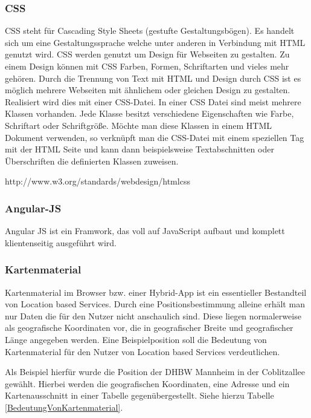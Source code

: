\subsubsection{CSS}
CSS steht für Cascading Style Sheets (gestufte Gestaltungsbögen). Es handelt sich um eine Gestaltungssprache welche unter anderen in Verbindung mit HTML genutzt wird. CSS werden genutzt um Design für Webseiten zu gestalten. Zu einem Design können mit CSS Farben, Formen, Schriftarten und vieles mehr gehören. Durch die Trennung von Text mit HTML und Design durch CSS ist es möglich mehrere Webseiten mit ähnlichem oder gleichen Design zu gestalten. Realisiert wird dies mit einer CSS-Datei. In einer CSS Datei sind meist mehrere Klassen vorhanden. Jede Klasse besitzt verschiedene Eigenschaften wie Farbe, Schriftart oder Schriftgröße. Möchte man diese Klassen in einem HTML Dokument verwenden, so verknüpft man die CSS-Datei mit einem speziellen Tag mit der HTML Seite und kann dann beispielsweise Textabschnitten oder Überschriften die definierten Klassen zuweisen.

http://www.w3.org/standards/webdesign/htmlcss

\subsubsection{Angular-JS}
Angular JS ist ein Framwork, das voll auf JavaScript aufbaut und komplett klientenseitig ausgeführt wird.

\subsubsection{Kartenmaterial}
Kartenmaterial im Browser bzw. einer Hybrid-App ist ein essentieller Bestandteil von Location based Services. Durch eine Positionsbestimmung alleine erhält man nur Daten die für den Nutzer nicht anschaulich sind. Diese liegen normalerweise als geografische Koordinaten vor, die in geografischer Breite und geografischer Länge angegeben werden. Eine Beispielposition soll die Bedeutung von Kartenmaterial für den Nutzer von Location based Services verdeutlichen.


Als Beispiel hierfür wurde die Position der DHBW Mannheim in der Coblitzallee gewählt. Hierbei werden die geografischen Koordinaten, eine Adresse und ein Kartenausschnitt in einer Tabelle gegenübergestellt. Siehe hierzu Tabelle \ref{BedeutungVonKartenmaterial}.

